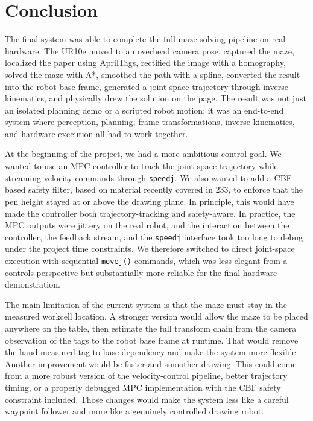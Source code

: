 \documentclass[11pt]{article}
\begin{document}
\section{Conclusion}

The final system was able to complete the full maze-solving pipeline on real hardware. The UR10e moved to an overhead camera pose, captured the maze, localized the paper using AprilTags, rectified the image with a homography, solved the maze with A*, smoothed the path with a spline, converted the result into the robot base frame, generated a joint-space trajectory through inverse kinematics, and physically drew the solution on the page. The result was not just an isolated planning demo or a scripted robot motion: it was an end-to-end system where perception, planning, frame transformations, inverse kinematics, and hardware execution all had to work together.

At the beginning of the project, we had a more ambitious control goal. We wanted to use an MPC controller to track the joint-space trajectory while streaming velocity commands through \texttt{speedj}. We also wanted to add a CBF-based safety filter, based on material recently covered in 233, to enforce that the pen height stayed at or above the drawing plane. In principle, this would have made the controller both trajectory-tracking and safety-aware. In practice, the MPC outputs were jittery on the real robot, and the interaction between the controller, the feedback stream, and the \texttt{speedj} interface took too long to debug under the project time constraints. We therefore switched to direct joint-space execution with sequential \texttt{movej()} commands, which was less elegant from a controls perspective but substantially more reliable for the final hardware demonstration.

The main limitation of the current system is that the maze must stay in the measured workcell location. A stronger version would allow the maze to be placed anywhere on the table, then estimate the full transform chain from the camera observation of the tags to the robot base frame at runtime. That would remove the hand-measured tag-to-base dependency and make the system more flexible. Another improvement would be faster and smoother drawing. This could come from a more robust version of the velocity-control pipeline, better trajectory timing, or a properly debugged MPC implementation with the CBF safety constraint included. Those changes would make the system less like a careful waypoint follower and more like a genuinely controlled drawing robot.
\end{document}
